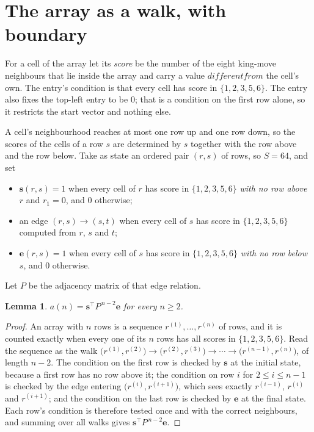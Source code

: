 \documentclass[11pt,a4paper]{article}
\theoremstyle{plain}
\newtheorem{lemma}[theorem]{Lemma}
\theoremstyle{definition}
\begin{document}
\section{The array as a walk, with boundary}

For a cell of the array let its \emph{score} be the number of the eight king-move neighbours that lie inside
the array and carry a value $different from$ the cell's own. The entry's condition is that every cell
has score in $\{1,2,3,5,6\}$. The entry also fixes the top-left entry to be $0$; that is a condition on the first row alone, so it restricts the start vector and nothing else.

A cell's neighbourhood reaches at most one row up and one row down, so the scores of the
cells of a row $s$ are determined by $s$ together with the row above and the row below.
Take as state an ordered pair $(r,s)$ of rows, so $S=64$, and set
\begin{itemize}
\item $\mathbf{s}(r,s)=1$ when every cell of $r$ has score in $\{1,2,3,5,6\}$ \emph{with no row
above $r$} and $r_1=0$, and $0$ otherwise;
\item an edge $(r,s)\to(s,t)$ when every cell of $s$ has score in $\{1,2,3,5,6\}$ computed from
$r$, $s$ and $t$;
\item $\mathbf{e}(r,s)=1$ when every cell of $s$ has score in $\{1,2,3,5,6\}$ \emph{with no row
below $s$}, and $0$ otherwise.
\end{itemize}
Let $P$ be the adjacency matrix of that edge relation.

\begin{lemma}\label{lem:walk}
$a(n)=\mathbf{s}^{\!\top}P^{\,n-2}\mathbf{e}$ for every $n\ge2$.
\end{lemma}

\begin{proof}
An array with $n$ rows is a sequence $r^{(1)},\dots,r^{(n)}$ of rows, and it is counted
exactly when every one of its $n$ rows has all scores in $\{1,2,3,5,6\}$. Read the sequence as the
walk $\bigl(r^{(1)},r^{(2)}\bigr)\to\bigl(r^{(2)},r^{(3)}\bigr)\to\cdots\to
\bigl(r^{(n-1)},r^{(n)}\bigr)$, of length $n-2$. The condition on the first row is
checked by $\mathbf{s}$ at the initial state, because a first row has no row above it; the
condition on row $i$ for $2\le i\le n-1$ is checked by the edge entering
$\bigl(r^{(i)},r^{(i+1)}\bigr)$, which sees exactly $r^{(i-1)}$, $r^{(i)}$ and
$r^{(i+1)}$; and the condition on the last row is checked by $\mathbf{e}$ at the final
state. Each row's condition is therefore tested once and with the correct neighbours, and
summing over all walks gives $\mathbf{s}^{\!\top}P^{\,n-2}\mathbf{e}$.
\end{proof}
\end{document}
